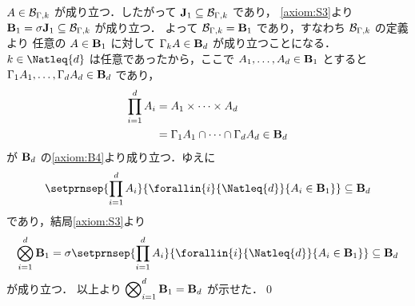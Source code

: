 \documentclass[a4paper,dvipdfmx,leqno]{jsarticle}
\begin{document}
{      \(A \in \mathcal{B}_{\Gamma, k}\) が成り立つ．したがって \(\mathbf{J}_{1} \subseteq \mathcal{B}_{\Gamma, k}\) であり，
      \eqref{axiom:S3}より \(\mathbf{B}_{1} = \sigma\mathbf{J}_{1} \subseteq \mathcal{B}_{\Gamma, k}\) が成り立つ．
      よって \(\mathcal{B}_{\Gamma, k} = \mathbf{B}_{1}\) であり，すなわち \(\mathcal{B}_{\Gamma, k}\) の定義より
      任意の \(A \in \mathbf{B}_{1}\) に対して \(\Gamma_{k}A \in \mathbf{B}_{d}\) が成り立つことになる．
    \decosep
      \(k \in \Natleq{d}\) は任意であったから，ここで \(A_{1}, \ldots, A_{d} \in \mathbf{B}_{1}\) とすると
      \(\Gamma_{1}A_{1}, \ldots, \Gamma_{d}A_{d} \in \mathbf{B}_{d}\) であり，
      \begin{align*}
        \prod_{i = 1}^{d} A_{i}
          &= A_{1} \times \cdots \times A_{d}
        \\&= \Gamma_{1}A_{1} \cap \cdots \cap \Gamma_{d}A_{d} \in \mathbf{B}_{d}
      \end{align*}
      が \(\mathbf{B}_{d}\) の\eqref{axiom:B4}より成り立つ．ゆえに
      \begin{align*}
        \setprnsep{\prod_{i = 1}^{d} A_{i}}{\forallin{i}{\Natleq{d}}{A_{i} \in \famBorel{1}}} \subseteq \famBorel{d}
      \end{align*}
      であり，結局\eqref{axiom:S3}より
      \begin{align*}
        \bigotimes_{i = 1}^{d} \famBorel{1}
          = \appv{\sigma}{\setprnsep{\prod_{i = 1}^{d} A_{i}}{\forallin{i}{\Natleq{d}}{A_{i} \in \famBorel{1}}}} \subseteq \famBorel{d}
      \end{align*}
      が成り立つ．
    \decosep
      以上より \(\displaystyle \bigotimes\nolimits_{i = 1}^{d} \mathbf{B}_{1} = \mathbf{B}_{d}\) が示せた．\qed
    }
\end{document}
